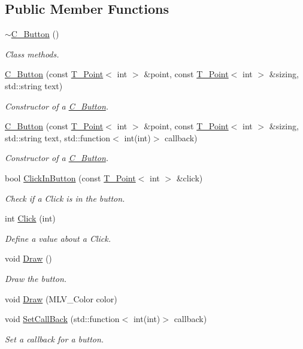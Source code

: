 \subsection*{Public Member Functions}
\begin{DoxyCompactItemize}
\item 
\hyperlink{classC__Button_a8581fb2ad14e232e97040388bdc992e4}{$\sim$\+C\+\_\+\+Button} ()
\begin{DoxyCompactList}\small\item\em Class methods. \end{DoxyCompactList}\item 
\hyperlink{classC__Button_a39291cec8e3a327343328f6fa1a3b3d9}{C\+\_\+\+Button} (const \hyperlink{classT__Point}{T\+\_\+\+Point}$<$ int $>$ \&point, const \hyperlink{classT__Point}{T\+\_\+\+Point}$<$ int $>$ \&sizing, std\+::string text)
\begin{DoxyCompactList}\small\item\em Constructor of a \hyperlink{classC__Button}{C\+\_\+\+Button}. \end{DoxyCompactList}\item 
\hyperlink{classC__Button_aed99ebc9be8ebd50a09c909eb95ec226}{C\+\_\+\+Button} (const \hyperlink{classT__Point}{T\+\_\+\+Point}$<$ int $>$ \&point, const \hyperlink{classT__Point}{T\+\_\+\+Point}$<$ int $>$ \&sizing, std\+::string text, std\+::function$<$ int(int)$>$ callback)
\begin{DoxyCompactList}\small\item\em Constructor of a \hyperlink{classC__Button}{C\+\_\+\+Button}. \end{DoxyCompactList}\item 
bool \hyperlink{classC__Button_a805c797b9afdddb5896a516a3e783882}{Click\+In\+Button} (const \hyperlink{classT__Point}{T\+\_\+\+Point}$<$ int $>$ \&click)
\begin{DoxyCompactList}\small\item\em Check if a Click is in the button. \end{DoxyCompactList}\item 
int \hyperlink{classC__Button_ac743591b5933dd95b571d5956c7d669b}{Click} (int)
\begin{DoxyCompactList}\small\item\em Define a value about a Click. \end{DoxyCompactList}\item 
void \hyperlink{classC__Button_a71f9a7d92a30818af1539104e6b963fb}{Draw} ()
\begin{DoxyCompactList}\small\item\em Draw the button. \end{DoxyCompactList}\item 
void \hyperlink{classC__Button_a6c507d4567ca21676e9980f8cf3d26b5}{Draw} (M\+L\+V\+\_\+\+Color color)
\item 
void \hyperlink{classC__Button_aedb01f3229d8176f6a9475cf2edae8f0}{Set\+Call\+Back} (std\+::function$<$ int(int)$>$ callback)
\begin{DoxyCompactList}\small\item\em Set a callback for a button. \end{DoxyCompactList}\end{DoxyCompactItemize}



